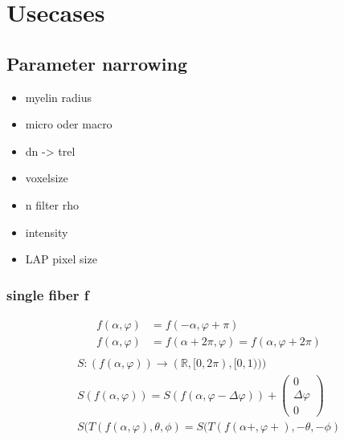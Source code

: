 \chapter{Usecases}
\label{sec:usecases}
%
\section{Parameter narrowing}
% 
\begin{itemize}
    \item myelin radius
    \item micro oder macro
    \item dn -> trel
    \item voxelsize
    \item n filter rho
    \item intensity
    \item LAP pixel size
\end{itemize}
% 
% 

\subsection{single fiber f}
\begin{align*}
    f(\alpha, \varphi) &= f(-\alpha, \varphi + \pi)\\
    f(\alpha, \varphi) &= f(\alpha+2\pi, \varphi)  = f(\alpha, \varphi+2\pi)\\
\end{align*}
\begin{align*}
    S:(f(\alpha, \varphi)) \rightarrow (\mathbb{R}, [0, 2 \pi), [0, 1)))\\
    S(f(\alpha, \varphi)) = S(f(\alpha, \varphi - \Delta\varphi)) + \begin{pmatrix}0\\ \Delta \varphi\\ 0\end{pmatrix}\\
    S(T(f(\alpha, \varphi), \theta, \phi) = S(T(f(\alpha+, \varphi+), -\theta, -\phi)
\end{align*}
% 
